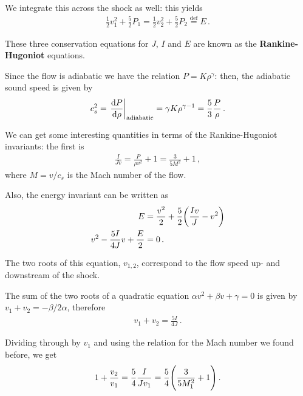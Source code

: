 \documentclass[main.tex]{subfiles}
\begin{document}
We integrate this across the shock as well: this yields 
%
\begin{align}
\frac{1}{2} v_1^2 + \frac{5}{2} P_1 =
\frac{1}{2} v_2^2 + \frac{5}{2} P_2
\overset{\text{def}}{=} E 
\,.
\end{align}

These three conservation equations for \(J\), \(I\) and \(E\) are known as the \textbf{Rankine-Hugoniot} equations. 

Since the flow is adiabatic we have the relation \(P = K \rho^{\gamma }\): then, the adiabatic sound speed is given by 
%
\begin{align}
c_s^2 = \eval{\dv{P}{\rho }}_{\text{adiabatic}} = \gamma K \rho^{\gamma -1} = \frac{5}{3} \frac{P}{\rho }
\,.
\end{align}

We can get some interesting quantities in terms of the Rankine-Hugoniot invariants: the first is 
%
\begin{align}
\frac{I}{Jv} = \frac{P}{\rho v^2} + 1 = \frac{3}{5 M^2} + 1 
\,,
\end{align}
%
where \(M = v / c_s\) is the Mach number of the flow. 

Also, the energy invariant can be written as 
%
\begin{align}
E &= \frac{v^2}{2} + \frac{5}{2} \qty(\frac{Iv}{J} - v^2)  \\
v^2 - \frac{5I}{4J} v + \frac{E}{2} &= 0 
\,.
\end{align}

The two roots of this equation, \(v_{1, 2}\), correspond to the flow speed up- and downstream of the shock.

The sum of the two roots of a quadratic equation \(\alpha v^2 + \beta v + \gamma = 0 \) is given by \(v_1 + v_2 = - \beta / 2 \alpha \), therefore 
%
\begin{align}
v_1 + v_2 = \frac{5I}{4J}
\,.
\end{align}

Dividing through by \(v_1 \) and using the relation for the Mach number we found before, we get 
%
\begin{align}
1 + \frac{v_2}{v_1 } = \frac{5}{4} \frac{I}{J v_1 }
= \frac{5}{4} \qty( \frac{3}{5 M_1^2}  + 1)
\,.
\end{align}
\end{document}
